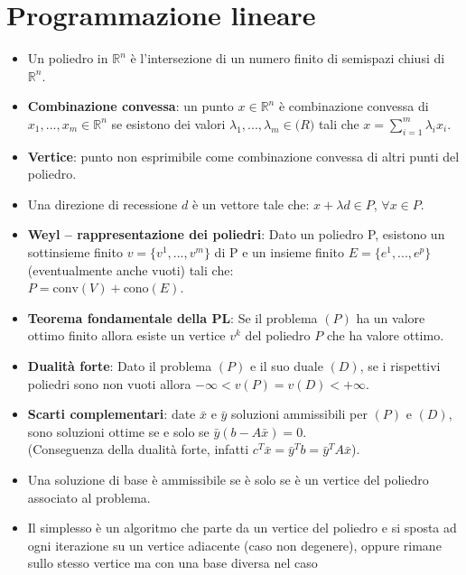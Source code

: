 \documentclass[fleqn,12pt]{article}
\begin{document}
\section{Programmazione lineare}
\begin{itemize}
    \item Un poliedro in $\mathbb{R}^n$ è l'intersezione di un numero finito di
        semispazi chiusi di $\mathbb{R}^n$.
    \item \textbf{Combinazione convessa}: un punto $x \in \mathbb{R}^n$ è
        combinazione convessa di $x_1,...,x_m \in \mathbb{R}^n$ se esistono dei
        valori $\lambda_1,...,\lambda_m \in \mathbb(R)$ tali che
        $x = \sum\limits_{i=1}^{m} \lambda_ix_i$.
    \item \textbf{Vertice}: punto non esprimibile come combinazione convessa di
        altri punti del poliedro.
    \item Una direzione di recessione $d$ è un vettore tale che:
        $x+\lambda d \in P$, $\forall x \in P$.
    \item \textbf{Weyl -- rappresentazione dei poliedri}: Dato un poliedro P,
        esistono un sottinsieme finito $v = \{v^1,...,v^m\}$ di P e un insieme
        finito $E = \{e^1,...,e^p\}$ (eventualmente anche vuoti) tali che: \\
        $P = \text{conv}(V)+\text{cono}(E)$.
    \item \textbf{Teorema fondamentale della PL}: Se il problema $(P)$ ha un
        valore ottimo finito allora esiste un vertice $v^k$ del poliedro $P$
        che ha valore ottimo.
    \item \textbf{Dualità forte}: Dato il problema $(P)$ e il suo duale $(D)$,
        se i rispettivi poliedri sono non vuoti allora $-\infty < v(P) = v(D) <
        +\infty$.
    \item \textbf{Scarti complementari}: date $\bar{x}$ e $\bar{y}$ soluzioni
        ammissibili per $(P)$ e $(D)$, sono soluzioni ottime se e solo se
        $\bar{y}(b-A\bar{x}) = 0$. \\
        (Conseguenza della dualità forte, infatti $c^T\bar{x} = \bar{y}^Tb =
        \bar{y}^TA\bar{x}$).
    \item Una soluzione di base è ammissibile se è solo se è un vertice del
        poliedro associato al problema.
    \item Il simplesso è un algoritmo che parte da un vertice del poliedro e si
        sposta ad ogni iterazione su un vertice adiacente (caso non degenere),
        oppure rimane sullo stesso vertice ma con una base diversa nel caso

\end{itemize}
\end{document}

